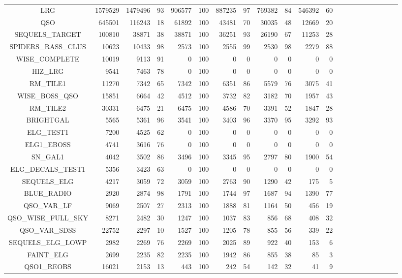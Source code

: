\documentclass[onecolumn]{aa}
\begin{document}
\begin{center}
\begin{longtable}{c rrr rrr rrrrrrrrrrrrrr}
\hline \hline
\endlastfoot
LRG & 1579529 & 1479496 & 93 & 906577 & 100 & 887235 & 97 & 769382 & 84 & 546392 & 60 \\ 
QSO & 645501 & 116243 & 18 & 61892 & 100 & 43481 & 70 & 30035 & 48 & 12669 & 20 \\ 
SEQUELS\_TARGET & 100810 & 38871 & 38 & 38871 & 100 & 36251 & 93 & 26190 & 67 & 11253 & 28 \\ 
SPIDERS\_RASS\_CLUS & 10623 & 10433 & 98 & 2573 & 100 & 2555 & 99 & 2530 & 98 & 2279 & 88 \\ 
WISE\_COMPLETE & 10019 & 9113 & 91 & 0 & 100 & 0 & 0 & 0 & 0 & 0 & 0 \\ 
HIZ\_LRG & 9541 & 7463 & 78 & 0 & 100 & 0 & 0 & 0 & 0 & 0 & 0 \\ 
RM\_TILE1 & 11270 & 7342 & 65 & 7342 & 100 & 6351 & 86 & 5579 & 76 & 3075 & 41 \\ 
WISE\_BOSS\_QSO & 15851 & 6664 & 42 & 4512 & 100 & 3732 & 82 & 3182 & 70 & 1957 & 43 \\ 
RM\_TILE2 & 30331 & 6475 & 21 & 6475 & 100 & 4586 & 70 & 3391 & 52 & 1847 & 28 \\ 
BRIGHTGAL & 5565 & 5361 & 96 & 3541 & 100 & 3403 & 96 & 3370 & 95 & 3292 & 93 \\ 
ELG\_TEST1 & 7200 & 4525 & 62 & 0 & 100 & 0 & 0 & 0 & 0 & 0 & 0 \\ 
ELG1\_EBOSS & 4741 & 3616 & 76 & 0 & 100 & 0 & 0 & 0 & 0 & 0 & 0 \\ 
SN\_GAL1 & 4042 & 3502 & 86 & 3496 & 100 & 3345 & 95 & 2797 & 80 & 1900 & 54 \\ 
ELG\_DECALS\_TEST1 & 5356 & 3423 & 63 & 0 & 100 & 0 & 0 & 0 & 0 & 0 & 0 \\ 
SEQUELS\_ELG & 4217 & 3059 & 72 & 3059 & 100 & 2763 & 90 & 1290 & 42 & 175 & 5 \\ 
BLUE\_RADIO & 2920 & 2874 & 98 & 1791 & 100 & 1744 & 97 & 1687 & 94 & 1390 & 77 \\ 
QSO\_VAR\_LF & 9069 & 2507 & 27 & 2313 & 100 & 1888 & 81 & 1164 & 50 & 456 & 19 \\ 
QSO\_WISE\_FULL\_SKY & 8271 & 2482 & 30 & 1247 & 100 & 1037 & 83 & 856 & 68 & 408 & 32 \\ 
QSO\_VAR\_SDSS & 22752 & 2297 & 10 & 1527 & 100 & 1205 & 78 & 855 & 56 & 339 & 22 \\ 
SEQUELS\_ELG\_LOWP & 2982 & 2269 & 76 & 2269 & 100 & 2025 & 89 & 922 & 40 & 153 & 6 \\ 
FAINT\_ELG & 2699 & 2235 & 82 & 2235 & 100 & 1942 & 86 & 855 & 38 & 85 & 3 \\ 
QSO1\_REOBS & 16021 & 2153 & 13 & 443 & 100 & 242 & 54 & 142 & 32 & 41 & 9 \\ 

\end{longtable}
\end{center}
\end{document}

